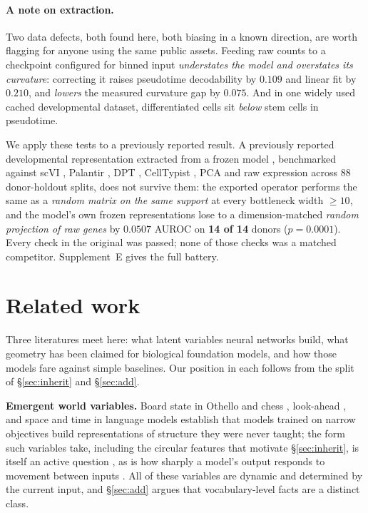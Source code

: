 \documentclass[11pt]{article}
\begin{document}
\paragraph{A note on extraction.} Two data defects, both found here, both biasing in a known direction,
are worth flagging for anyone using the same public assets. Feeding raw counts to a checkpoint
configured for binned input \emph{understates the model and overstates its curvature}: correcting it
raises pseudotime decodability by $0.109$ and linear fit by $0.210$, and \emph{lowers} the measured
curvature gap by $0.075$. And in one widely used cached developmental dataset, differentiated cells sit
\emph{below} stem cells in pseudotime.

We apply these tests to a previously reported result. A
previously reported developmental representation extracted from a frozen model
\citep{kendiukhov2026hematopoietic}, benchmarked against scVI \citep{lopez2018scvi}, Palantir
\citep{setty2019palantir}, DPT \citep{haghverdi2016dpt}, CellTypist \citep{dominguezconde2022celltypist},
PCA and raw expression across 88 donor-holdout splits, does not survive them: the exported operator
performs the same as a \emph{random matrix on the same support} at every bottleneck width ${\ge}10$,
and the model's own frozen representations lose to a dimension-matched \emph{random projection of raw
genes} by $0.0507$ AUROC on \textbf{14 of 14} donors ($p=0.0001$). Every check in the original was
passed; none of those checks was a matched competitor. Supplement~E gives the full battery.

\section{Related work}

Three literatures meet here: what latent variables neural networks build, what geometry has been
claimed for biological foundation models, and how those models fare against simple baselines. Our
position in each follows from the split of \S\ref{sec:inherit} and \S\ref{sec:add}.

\textbf{Emergent world variables.} Board state in Othello \citep{li2023othello,nanda2023linear} and
chess \citep{karvonen2024chess}, look-ahead \citep{jenner2024lookahead}, and space and time in language
models \citep{gurnee2024spacetime} establish that models trained on narrow objectives build
representations of structure they were never taught; the form such variables take, including the
circular features that motivate \S\ref{sec:inherit}, is itself an active question
\citep{engels2025circular,park2024linear}, as is how sharply a model's output responds to movement
between inputs \citep{shinkle2025plateaus}. All of these variables are dynamic and determined by the
current input, and \S\ref{sec:add} argues that vocabulary-level facts are a distinct class.
\end{document}

